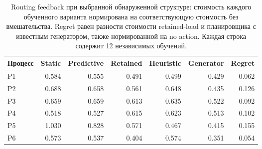 \begin{table}[t]\caption{Routing feedback при выбранной обнаруженной структуре: стоимость каждого обученного варианта нормирована на соответствующую стоимость без вмешательства. Regret равен разности стоимости retained-load и планировщика с известным генератором, также нормированной на no action. Каждая строка содержит 12 независимых обучений.}\label{tab:structures_results}\centering\small\setlength{\tabcolsep}{4pt}
\begin{tabular}{lrrrrrr}\toprule
Процесс & Static & Predictive & Retained & Heuristic & Generator & Regret\\\midrule
P1 & 0.584 & 0.555 & 0.491 & 0.499 & 0.429 & 0.062 \\
P2 & 0.688 & 0.658 & 0.561 & 0.648 & 0.435 & 0.126 \\
P3 & 0.659 & 0.659 & 0.613 & 0.635 & 0.522 & 0.092 \\
P4 & 0.518 & 0.527 & 0.615 & 0.623 & 0.513 & 0.102 \\
P5 & 1.030 & 0.828 & 0.571 & 0.467 & 0.415 & 0.155 \\
P6 & 0.573 & 0.537 & 0.404 & 0.574 & 0.351 & 0.054 \\
\bottomrule\end{tabular}\end{table}
